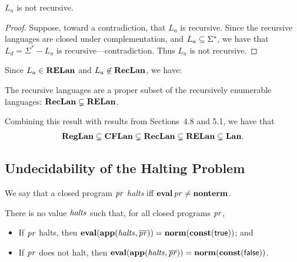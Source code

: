 \begin{corollary}
\label{RECor3}

$L_a$ is not recursive.
\end{corollary}

\begin{proof}
Suppose, toward a contradiction, that $L_a$ is recursive.
Since the recursive languages are closed under complementation,
and $L_a\subseteq\Sigma^*$, we have that $L_d=\Sigma^*-L_a$ is
recursive---contradiction.  Thus $L_a$ is not recursive.
\end{proof}

Since $L_a\in\mathbf{RELan}$ and $L_a\not\in\mathbf{RecLan}$, we have:

%
%
\begin{theorem}
The recursive languages are a proper subset of the recursively
enumerable languages: $\mathbf{RecLan}\subsetneq \mathbf{RELan}$.
\end{theorem}

Combining this result with results
from Sections~4.8 and 5.1, we have that
\begin{gather*}
\mathbf{RegLan}\subsetneq
\mathbf{CFLan}\subsetneq
\mathbf{RecLan}\subsetneq
\mathbf{RELan}\subsetneq
\mathbf{Lan} .
\end{gather*}

\subsection{Undecidability of the Halting Problem}

%

%
We say that a closed program $\mathit{pr}$ \emph{halts} iff
$\mathbf{eval}\,\mathit{pr}\neq\mathbf{nonterm}$.

\begin{theorem}
\label{Halting}

There is no value $\mathit{halts}$ such that, for all closed programs $\mathit{pr}$,
\begin{itemize}
\item If $\mathit{pr}$ halts, then $\mathbf{eval}(\mathbf{app}(\mathit{halts},\overline{\mathit{pr}})) =
  \mathbf{norm}(\mathbf{const}(\mathsf{true}))$; and

\item If $\mathit{pr}$ does not halt, then
  $\mathbf{eval}(\mathbf{app}(\mathit{halts},\overline{\mathit{pr}})) = \mathbf{norm}(\mathbf{const}(\mathsf{false}))$.
\end{itemize}
\end{theorem}

